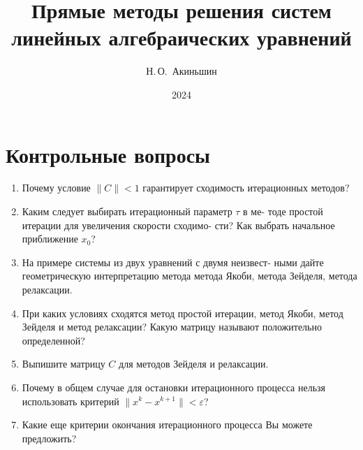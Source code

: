 \documentclass{article}
\title{Прямые методы решения систем
линейных алгебраических уравнений}
\author{Н.\,О.~Акиньшин}
\date{2024}
\begin{document}
    \maketitle
    \newpage
    \tableofcontents
    \newpage

    \section{Контрольные вопросы}
    \begin{enumerate}
        \item Почему условие $\|C\| < 1$ гарантирует сходимость итерационных методов?
        \item Каким следует выбирать итерационный параметр $\tau$ в ме-
        тоде простой итерации для увеличения скорости сходимо-
        сти? Как выбрать начальное приближение $x_0$?
        \item На примере системы из двух уравнений с двумя неизвест-
        ными дайте геометрическую интерпретацию метода метода
        Якоби, метода Зейделя, метода релаксации.
        \item При каких условиях сходятся метод простой итерации,
        метод Якоби, метод Зейделя и метод релаксации? Какую
        матрицу называют положительно определенной?
        \item Выпишите матрицу $C$ для методов Зейделя и релаксации.
        \item Почему в общем случае для остановки итерационного
        процесса нельзя использовать критерий $\|x^k - x^{k+1}\| < \varepsilon$?
        \item Какие еще критерии окончания итерационного процесса
        Вы можете предложить?
    \end{enumerate}
    
\end{document}
